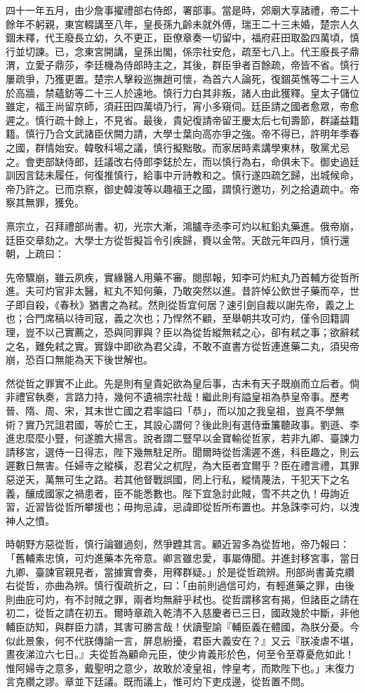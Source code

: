 \begin{pinyinscope}
四十一年五月，由少詹事擢禮部右侍郎，署部事。當是時，郊廟大享諸禮，帝二十餘年不躬親，東宮輟講至八年，皇長孫九齡未就外傅，瑞王二十三未婚，楚宗人久錮未釋，代王廢長立幼，久不更正，臣僚章奏一切留中，福府莊田取盈四萬頃，慎行並切諫。已，念東宮開講，皇孫出閣，係宗社安危，疏至七八上。代王廢長子鼎渭，立愛子鼎莎，李廷機為侍郎時主之，其後，群臣爭者百餘疏，帝皆不省。慎行屢疏爭，乃獲更置。楚宗人擊殺巡撫趙可懷，為首六人論死，復錮英憔等二十三人於高牆，禁蘊鈁等二十三人於遠地。慎行力白其非叛，諸人由此獲釋。皇太子儲位雖定，福王尚留京師，須莊田四萬頃乃行，宵小多窺伺。廷臣請之國者愈眾，帝愈遲之。慎行疏十餘上，不見省。最後，貴妃復請帝留王慶太后七旬壽節，群議益籍籍。慎行乃合文武諸臣伏闕力請，大學士葉向高亦爭之強。帝不得已，許明年季春之國，群情始安。韓敬科場之議，慎行擬黜敬。而家居時素講學東林，敬黨尤忌之。會吏部缺侍郎，廷議改右侍郎李鋕於左，而以慎行為右，命俱未下。御史過廷訓因言鋕未履任，何復推慎行，給事中亓詩教和之。慎行遂四疏乞歸，出城候命，帝乃許之。已而京察，御史韓浚等以趣福王之國，謂慎行邀功，列之拾遺疏中。帝察其無罪，獲免。

熹宗立，召拜禮部尚書。初，光宗大漸，鴻臚寺丞李可灼以紅鉛丸藥進。俄帝崩，廷臣交章劾之。大學士方從哲擬旨令引疾歸，賚以金幣。天啟元年四月，慎行還朝，上疏曰：

先帝驟崩，雖云夙疾，實緣醫人用藥不審。閱邸報，知李可灼紅丸乃首輔方從哲所進。夫可灼官非太醫，紅丸不知何藥，乃敢突然以進。昔許悼公飲世子藥而卒，世子即自殺，《春秋》猶書之為弒。然則從哲宜何居？速引劍自裁以謝先帝，義之上也；合門席稿以待司寇，義之次也；乃悍然不顧，至舉朝共攻可灼，僅令回籍調理，豈不以己實薦之，恐與同罪與？臣以為從哲縱無弒之心，卻有弒之事；欲辭弒之名，難免弒之實。實錄中即欲為君父諱，不敢不直書方從哲連進藥二丸，須臾帝崩，恐百口無能為天下後世解也。

然從哲之罪實不止此。先是則有皇貴妃欲為皇后事，古未有天子既崩而立后者。倘非禮官執奏，言路力持，幾何不遺禍宗社哉！繼此則有謚皇祖為恭皇帝事。歷考晉、隋、周、宋，其末世亡國之君率謚曰「恭」，而以加之我皇祖，豈真不學無術？實乃咒詛君國，等於亡王，其設心謂何？後此則有選侍垂簾聽政事。劉遜、李進忠麼麼小豎，何遂膽大揚言。說者謂二豎早以金寶輸從哲家，若非九卿、臺諫力請移宮，選侍一日得志，陛下幾無駐足所。聞爾時從哲濡遲不進，科臣趣之，則云遲數日無害。任婦寺之縱橫，忍君父之杌隉，為大臣者宜爾乎？臣在禮言禮，其罪惡逆天，萬無可生之路。若其他督戰誤國，罔上行私，縱情蔑法，干犯天下之名義，釀成國家之禍患者，臣不能悉數也。陛下宜急討此賊，雪不共之仇！毋詢近習，近習皆從哲所攀援也；毋拘忌諱，忌諱即從哲所布置也。并急誅李可灼，以洩神人之憤。

時朝野方惡從哲，慎行論雖過刻，然爭韙其言。顧近習多為從哲地，帝乃報曰：「舊輔素忠慎，可灼進藥本先帝意。卿言雖忠愛，事屬傳聞。并進封移宮事，當日九卿、臺諫官親見者，當據實會奏，用釋群疑。」於是從哲疏辨。刑部尚書黃克纘右從哲，亦曲為辨。慎行復疏折之，曰：「由前則過信可灼，有輕進藥之罪，由後則曲庇可灼，有不討賊之罪，兩者均無辭乎弒也。從哲謂移宮有揭，但諸臣之請在初二，從哲之請在初五。爾時章疏入乾清不入慈慶者已三日，國政幾於中斷，非他輔臣訪知，與群臣力請，其害可勝言哉！伏讀聖諭『輔臣義在體國，為朕分憂。今似此景象，何不代朕傳諭一言，屏息紛擾，君臣大義安在？』又云『朕凌虐不堪，晝夜涕泣六七日。』夫從哲為顧命元臣，使少肯義形於色，何至令至尊憂危如此！惟阿婦寺之意多，戴聖明之意少，故敢於凌皇祖，悖皇考，而欺陛下也。」末復力言克纘之謬。章並下廷議。既而議上，惟可灼下吏戍邊，從哲置不問。


\end{pinyinscope}
